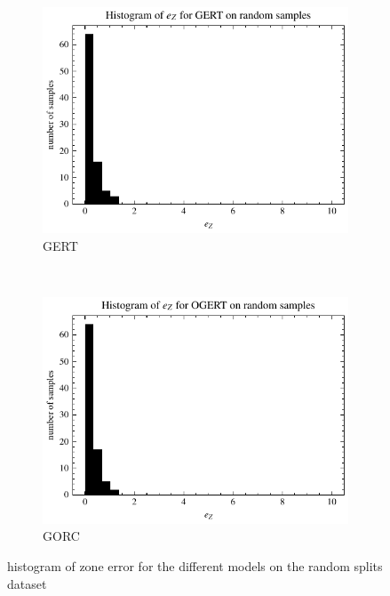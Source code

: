 \begin{figure}[ht]
\begin{subfigure}[t]{0.5\textwidth}
    \end{subfigure}
    \\[1ex]
    \centering
    \begin{subfigure}[t]{0.5\textwidth}
        \centering
        \includegraphics[width=\textwidth]{chapters/figures/result_histograms/result_histogram_random_sample_zone_sum_error_GERT.pdf}
        \captionsetup{width=.9\linewidth}
        \caption{GERT}
    \end{subfigure}%
    ~ 
    \begin{subfigure}[t]{0.5\textwidth}
        \centering
        \includegraphics[width=\textwidth]{chapters/figures/result_histograms/result_histogram_random_sample_zone_sum_error_OGERT.pdf}
        \captionsetup{width=.9\linewidth}
        \caption{GORC}
    \end{subfigure}
    \caption{histogram of zone error for the different models on the random splits dataset}
    \label{fig:result_random_sample_dist}
\end{figure}

